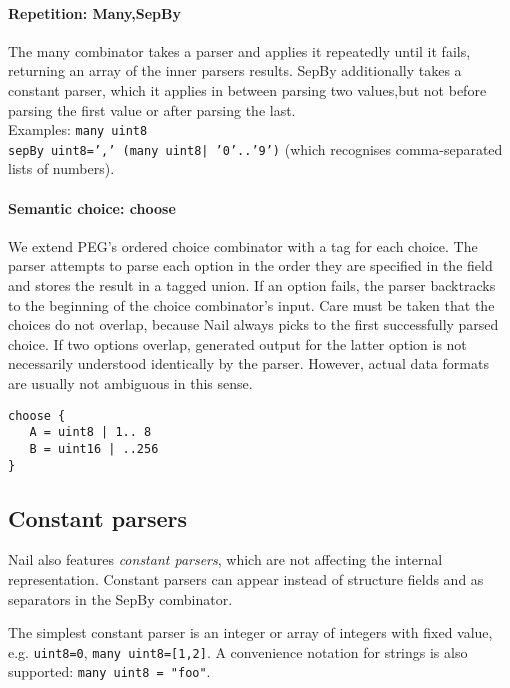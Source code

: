 \paragraph{Repetition: Many,SepBy}
The many combinator takes a parser and applies it repeatedly until it fails,
returning an array of the inner parsers results. SepBy additionally takes a
constant parser, which it applies in between
parsing two values,but not before parsing the first value or after parsing the last.\\
Examples: \texttt{many uint8}\\ \texttt{sepBy uint8=',' (many uint8| '0'..'9')}
(which recognises comma-separated lists of numbers).



\paragraph{Semantic choice: choose}
We extend PEG's ordered choice combinator with a tag for each choice. The parser
attempts to parse each option in the order they are specified in the field and
stores the result in a tagged union. If an option fails, the parser backtracks
to the beginning of the choice combinator's input. Care must be taken that the
choices do not overlap, because Nail always picks to the first successfully
parsed choice. If two options overlap, generated output for the latter option is
not necessarily understood identically by the parser. However, actual data
formats are usually not ambiguous in this sense.

\begin{verbatim}
choose {
   A = uint8 | 1.. 8
   B = uint16 | ..256
}
\end{verbatim}

\subsection{Constant parsers}
Nail also features \emph{constant parsers}, which are not affecting the internal
representation. Constant parsers can appear instead of structure fields and as
separators in the SepBy combinator.

The simplest constant parser is an integer or array of integers with fixed
value, e.g. \texttt{uint8=0}, \texttt{many uint8=[1,2]}. A convenience notation
for strings is also supported: \texttt{many uint8 = "foo"}.


